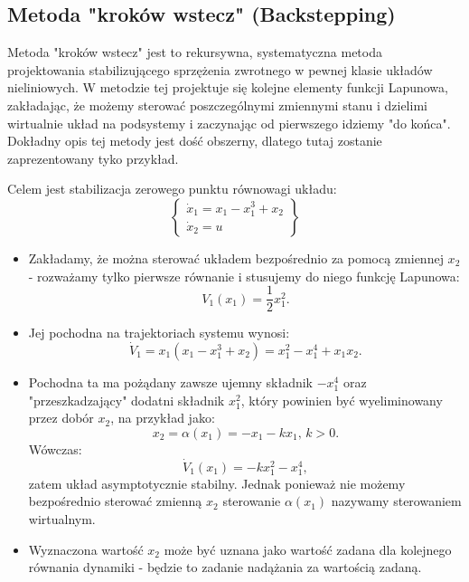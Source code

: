 \documentclass{article}
\begin{document}
    \subsection{Metoda "kroków wstecz" (Backstepping)}
    Metoda "kroków wstecz" jest to rekursywna, systematyczna metoda projektowania stabilizującego sprzężenia zwrotnego w pewnej klasie układów nieliniowych.
    W metodzie tej projektuje się kolejne elementy funkcji Lapunowa, zakładając, że możemy sterować poszczególnymi zmiennymi stanu i dzielimi wirtualnie układ na podsystemy i zaczynając od pierwszego idziemy "do końca".
    Dokładny opis tej metody jest dość obszerny, dlatego tutaj zostanie zaprezentowany tyko przykład.

    \begin{tcolorbox}[colback=green!5, colframe=green!75!black, title=Przykład]
    Celem jest stabilizacja zerowego punktu równowagi układu:
    $$
        \left\{
        \begin{array}{l}
             \dot{x}_{1} = x_{1} - x_{1}^{3} + x_{2}\\
             \dot{x}_{2} = u
        \end{array}
        \right\}
    $$
    \begin{itemize}
        \item Zakładamy, że można sterować układem bezpośrednio za pomocą zmiennej $x_{2}$ - rozważamy tylko pierwsze równanie i stusujemy do niego funkcję Lapunowa:
        $$
            V_{1}(x_{1}) = \frac{1}{2}x_{1}^{2}.
        $$
        \item Jej pochodna na trajektoriach systemu wynosi:
        $$
            \dot{V}_{1} = x_{1}(x_{1} - x_{1}^{3} + x_{2}) = x_{1}^{2} - x_{1}^{4} + x_{1}x_{2}.
        $$
        \item Pochodna ta ma pożądany zawsze ujemny składnik $-x_{1}^{4}$ oraz "przeszkadzający" dodatni składnik $x_{1}^{2}$, który powinien być wyeliminowany przez dobór $x_{2}$, na przykład jako:
        $$
            x_{2} =\alpha(x_{1}) = -x_{1} - kx_{1}, \, k>0.
        $$
        Wówczas:
        $$
            \dot{V}_{1}(x_{1}) = -k{x}_{1}^{2} - x_{1}^{4},
        $$
        zatem układ asymptotycznie stabilny.
        Jednak ponieważ nie możemy bezpośrednio sterować zmienną $x_{2}$ sterowanie $\alpha(x_{1})$ nazywamy sterowaniem wirtualnym.
        \item Wyznaczona wartość $x_{2}$ może być uznana jako wartość zadana dla kolejnego równania dynamiki - będzie to zadanie nadążania za wartością zadaną.

\end{itemize}
\end{tcolorbox}
\end{document}
